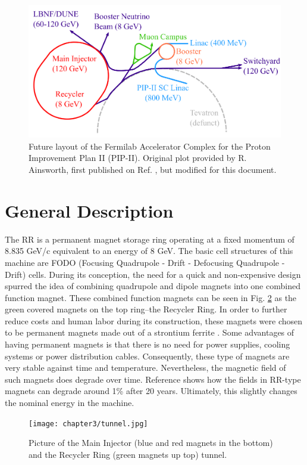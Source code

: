 \begin{figure}[H]
   \centering
   \includegraphics[width=\columnwidth]{chapter3/complexPIPII.png}
   \caption{Future layout of the Fermilab Accelerator Complex for the Proton Improvement Plan II (PIP-II). Original plot provided by R. Ainsworth, first published on Ref. \cite{rr1}, but modified for this document.}
   \label{fig:fnalpip2}
\end{figure}

\section{General Description}

The RR is a permanent magnet storage ring operating at a fixed momentum of 8.835 GeV/c equivalent to an energy of 8 GeV. The basic cell structures of this machine are FODO (Focusing Quadrupole - Drift - Defocusing Quadrupole - Drift) cells. During its conception, the need for a quick and non-expensive design spurred the idea of combining quadrupole and dipole magnets into one combined function magnet. These combined function magnets can be seen in Fig. \ref{fig:rrtunnel} as the green covered magnets on the top ring--the Recycler Ring. In order to further reduce costs and human labor during its construction, these magnets were chosen to be permanent magnets made out of a strontium ferrite \cite{rr0}. Some advantages of having permanent magnets is that there is no need for power supplies, cooling systems or power distribution cables. Consequently, these type of magnets are very stable against time and temperature. Nevertheless, the magnetic field of such magnets does degrade over time. Reference \cite{rr1} shows how the fields in RR-type magnets can degrade around 1\% after 20 years. Ultimately, this slightly changes the nominal energy in the machine. 

\begin{figure}[H]
   \centering
   \texttt{[image: chapter3/tunnel.jpg]}
   \caption{Picture of the Main Injector (blue and red magnets in the bottom) and the Recycler Ring (green magnets up top) tunnel.}
   \label{fig:rrtunnel}
\end{figure}


